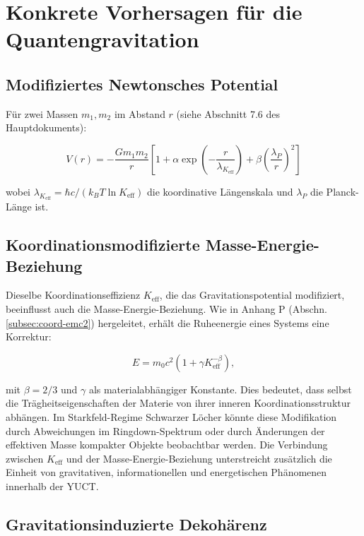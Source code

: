 \documentclass[12pt,a4paper]{article}
\theoremstyle{remark}
\newcommand{\Keff}{K_{\mathrm{eff}}}
\begin{document}
	\section{Konkrete Vorhersagen für die Quantengravitation}
	\label{sec:predictions}
	
	\subsection{Modifiziertes Newtonsches Potential}
	
	Für zwei Massen $m_1, m_2$ im Abstand $r$ (siehe Abschnitt 7.6 des Hauptdokuments):
	
	\begin{equation}
		V(r) = -\frac{G m_1 m_2}{r} \left[ 1 + \alpha \exp\left(-\frac{r}{\lambda_{\Keff}}\right) + \beta \left(\frac{\lambda_P}{r}\right)^2 \right]
	\end{equation}
	
	wobei $\lambda_{\Keff} = \hbar c / (k_B T \ln \Keff)$ die koordinative Längenskala und $\lambda_P$ die Planck-Länge ist.
	
	\subsection{Koordinationsmodifizierte Masse-Energie-Beziehung}
	\label{subsec:coord-emc2-G}
	
	Dieselbe Koordinationseffizienz $K_{\mathrm{eff}}$, die das Gravitationspotential modifiziert, beeinflusst auch die Masse-Energie-Beziehung. Wie in Anhang P (Abschn. \ref{subsec:coord-emc2}) hergeleitet, erhält die Ruheenergie eines Systems eine Korrektur:
	
	\[
	E = m_{0} c^{2} \left(1 + \gamma K_{\mathrm{eff}}^{-\beta}\right),
	\]
	
	mit $\beta = 2/3$ und $\gamma$ als materialabhängiger Konstante. Dies bedeutet, dass selbst die Trägheitseigenschaften der Materie von ihrer inneren Koordinationsstruktur abhängen. Im Starkfeld-Regime Schwarzer Löcher könnte diese Modifikation durch Abweichungen im Ringdown-Spektrum oder durch Änderungen der effektiven Masse kompakter Objekte beobachtbar werden. Die Verbindung zwischen $K_{\mathrm{eff}}$ und der Masse-Energie-Beziehung unterstreicht zusätzlich die Einheit von gravitativen, informationellen und energetischen Phänomenen innerhalb der YUCT.
	
	\subsection{Gravitationsinduzierte Dekohärenz}
	
\end{document}

